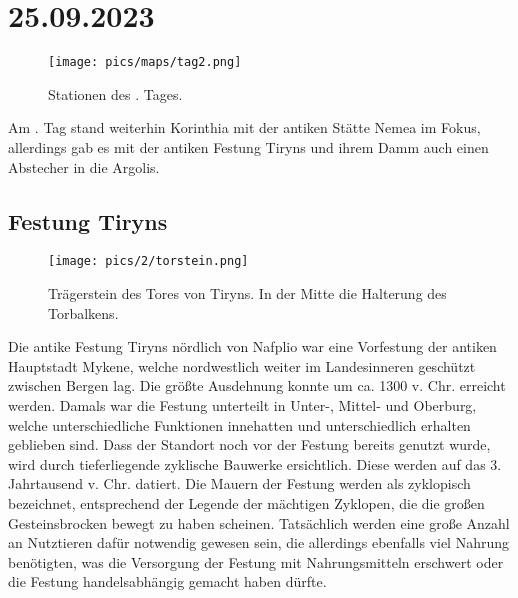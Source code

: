 \documentclass[preprint]{geomorphica} %
\begin{document}
\section{25.09.2023}

\begin{figure}[!h]
    \vspace{-5mm}
    \centering
    \texttt{[image: pics/maps/tag2.png]}
    \caption{Stationen des \theday. Tages.}
    \label{pic:tag2}
\end{figure}

Am \theday. Tag stand weiterhin Korinthia mit der antiken Stätte Nemea im Fokus, allerdings gab es mit der antiken Festung Tiryns und ihrem Damm auch einen Abstecher in die Argolis.

\subsection{Festung Tiryns}

\begin{wrapfigure}{r}{0.3\textwidth}
    \vspace{-5mm}
    \centering
    \texttt{[image: pics/2/torstein.png]}
    \caption{Trägerstein des Tores von Tiryns. In der Mitte die Halterung des Torbalkens.}
    \vspace{-10mm}
    \label{pic:torstein}
\end{wrapfigure}

Die antike Festung Tiryns nördlich von Nafplio war eine Vorfestung der antiken Hauptstadt Mykene, welche nordwestlich weiter im Landesinneren geschützt zwischen Bergen lag. Die größte Ausdehnung konnte um ca. 1300 v. Chr. erreicht werden. Damals war die Festung unterteilt in Unter-, Mittel- und Oberburg, welche unterschiedliche Funktionen innehatten und unterschiedlich erhalten geblieben sind. Dass der Standort noch vor der Festung bereits genutzt wurde, wird durch tieferliegende zyklische Bauwerke ersichtlich. Diese werden auf das 3. Jahrtausend v. Chr. datiert. Die Mauern der Festung werden als zyklopisch bezeichnet, entsprechend der Legende der mächtigen Zyklopen, die die großen Gesteinsbrocken bewegt zu haben scheinen. Tatsächlich werden eine große Anzahl an Nutztieren dafür notwendig gewesen sein, die allerdings ebenfalls viel Nahrung benötigten, was die Versorgung der Festung mit Nahrungsmitteln erschwert oder die Festung handelsabhängig gemacht haben dürfte.
\end{document}
